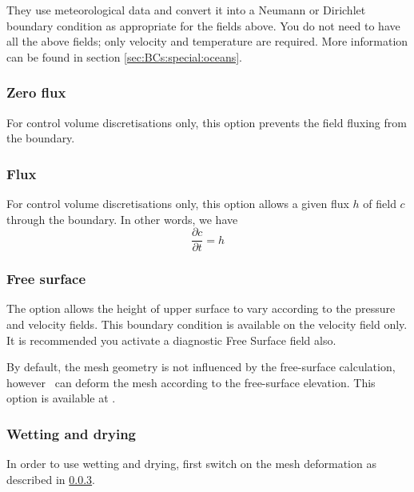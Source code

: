They use meteorological data and convert it into a Neumann or Dirichlet boundary condition
as appropriate for the fields above. You do not need to have all the above fields; only 
velocity and temperature are required. More information can be found in section \ref{sec:BCs:special:oceans}.

\subsubsection{Zero flux}

For control volume discretisations only, this option prevents the field fluxing from the boundary.

\subsubsection{Flux}

For control volume discretisations only, this option allows a given flux $h$ of field $c$ through the boundary. In other words, we have
\begin{equation*}
   \frac{\partial c}{\partial t} = h
\end{equation*}

\subsubsection{Free surface}\label{subsec:free_surface_bc}

The  option allows the height of upper surface to vary according
to the pressure and velocity fields. This boundary condition is available on the velocity field only. It is
recommended you activate a diagnostic Free Surface field also.

By default, the mesh geometry is not influenced by the free-surface calculation, however \fluidity\ can deform the mesh according to the free-surface elevation. 
This option is available at .


\subsubsection{Wetting and drying}\label{subsec:wetting_drying_bc}

In order to use wetting and drying, first switch on the mesh deformation as described in \ref{subsec:free_surface_bc}.

